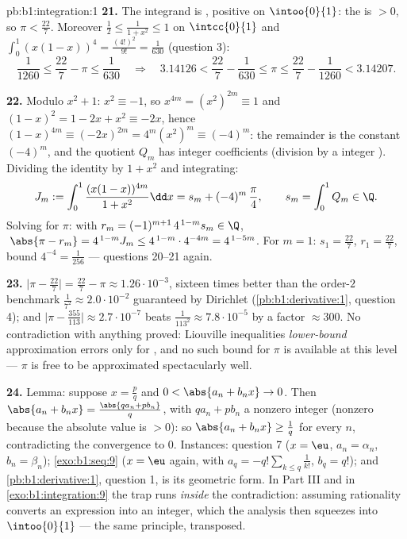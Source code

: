 \begin{solution}{pb:b1:integration:1}
\textbf{21.} The integrand is , positive on
$\intoo{0}{1}$: the  is $> 0$, so $\pi < \frac{22}{7}$.
Moreover $\frac12 \leq \frac{1}{1+x^2} \leq 1$ on
$\intcc{0}{1}$ and $\int_0^1 (x(1-x))^4 = \frac{(4!)^2}{9!} =
\frac{1}{630}$ (question 3):
\[
\frac{1}{1260} \leq \frac{22}{7} - \pi \leq \frac{1}{630}
\quad\Longrightarrow\quad
3.14126 < \frac{22}{7} - \frac{1}{630} \leq \pi \leq
\frac{22}{7} - \frac{1}{1260} < 3.14207 .
\]

\textbf{22.} Modulo $x^2 + 1$: $x^2 \equiv -1$, so $x^{4m} =
(x^2)^{2m} \equiv 1$ and $(1 - x)^2 = 1 - 2x + x^2 \equiv -2x$,
hence $(1-x)^{4m} \equiv (-2x)^{2m} = 4^m (x^2)^m \equiv
(-4)^m$: the remainder is the constant $(-4)^m$, and the
quotient $Q_m$ has integer coefficients (division by a 
integer ). Dividing the identity by $1 + x^2$ and
integrating:
\[
J_m := \int_0^1 \frac{(x(1-x))^{4m}}{1+x^2}\dd x
= s_m + (-4)^m\,\frac{\pi}{4},
\qquad s_m = \int_0^1 Q_m \in \Q .
\]
Solving for $\pi$: with $r_m = (-1)^{m+1}\,4^{\,1-m} s_m \in
\Q$, $\;\abs{\pi - r_m} = 4^{\,1-m} J_m \leq
4^{\,1-m}\cdot4^{-4m} = 4^{\,1-5m}$. For $m = 1$: $s_1 =
\frac{22}{7}$, $r_1 = \frac{22}{7}$, bound $4^{-4} =
\frac{1}{256}$ --- questions 20--21 again.

\textbf{23.} $\bigl|\pi - \frac{22}{7}\bigr| = \frac{22}{7} -
\pi \approx 1.26\cdot10^{-3}$, sixteen times better than the
order-$2$ benchmark $\frac{1}{7^2} \approx 2.0\cdot10^{-2}$
guaranteed by Dirichlet (\cref{pb:b1:derivative:1}, question 4);
and $\bigl|\pi - \frac{355}{113}\bigr| \approx 2.7\cdot10^{-7}$
beats $\frac{1}{113^2} \approx 7.8\cdot10^{-5}$ by a factor
$\approx 300$. No contradiction with anything proved: Liouville
inequalities \emph{lower-bound} approximation errors only for
, and no such bound for $\pi$ is available at
this level --- $\pi$ is free to be approximated spectacularly
well.

\textbf{24.} Lemma: suppose $x = \frac pq$ and $0 < \abs{a_n +
b_n x} \to 0$. Then $\abs{a_n + b_n x} = \frac{\abs{q a_n + p
b_n}}{q}$, with $q a_n + p b_n$ a nonzero integer (nonzero
because the absolute value is $> 0$): so $\abs{a_n + b_n x}
\geq \frac1q$ for every $n$, contradicting the convergence to
$0$. Instances: question 7 ($x = \eu$, $a_n = \alpha_n$, $b_n =
\beta_n$); \cref{exo:b1:seq:9} ($x = \eu$ again, with $a_q =
-q!\sum_{k \leq q}\frac{1}{k!}$, $b_q = q!$); and
\cref{pb:b1:derivative:1}, question 1, is its geometric form.
In Part III and in \cref{exo:b1:integration:9} the trap runs
\emph{inside} the contradiction: assuming rationality converts
an expression into an integer, which the analysis then squeezes
into $\intoo{0}{1}$ --- the same principle, transposed.


\end{solution}
